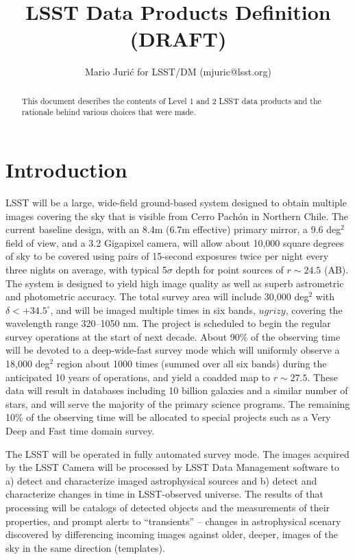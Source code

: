 \documentclass[12pt]{article}
\title{LSST Data Products Definition (DRAFT)}
\author{Mario Juri\'c for LSST/DM (mjuric@lsst.org)}
\newcommand{\B}[1]{{#1}}
\newcommand{\R}[1]{{\color{red}}}
\begin{document}
\maketitle

\begin{abstract}
This document describes the contents of Level 1 and 2 LSST data products and the rationale behind various choices that were made.
\end{abstract}

\tableofcontents

\section{Introduction}

LSST will be a large, wide-field ground-based system
designed to obtain multiple images covering the sky that is visible from Cerro Pach\'{o}n in Northern Chile. The current baseline design, with an 8.4m (6.7m effective) primary mirror, a 9.6 deg$^2$ field of view, and a 3.2 Gigapixel camera, will allow about 10,000 square degrees of sky to be covered using pairs  of 15-second exposures \R{in two photometric bands} \B{twice per night} every three nights on average, with typical 5$\sigma$ depth for point sources of $r\sim24.5$ (AB). The system is designed to yield high image quality as well as superb astrometric  and photometric accuracy. The \B{total} survey area will include 30,000 deg$^2$ with $\delta<+34.5^\circ$, and will be imaged multiple times in six bands, $ugrizy$, covering the wavelength range 320--1050 nm. The project is scheduled to  begin the regular survey operations at the start of next decade. About 90\% of the observing time will be devoted to a deep-wide-fast survey mode which will \B{uniformly} observe a 18,000 deg$^2$ region about 1000 times (summed over all six bands) during the anticipated 10 years of operations, and yield a coadded map to $r\sim27.5$. These data will result in databases including 10 billion galaxies and a similar number of stars, and will serve the majority of the primary science programs. The remaining 10\% of the observing time will be allocated to special projects such as a Very Deep and Fast time domain survey.

The LSST will be operated in fully automated survey mode. The images acquired by the LSST Camera will be processed by LSST Data Management software to a) detect and characterize imaged astrophysical sources and b) detect and characterize changes in time in LSST-observed universe. The results of that processing will be catalogs of detected objects and the measurements of their properties, and prompt alerts to ``transients'' -- changes in astrophysical scenary discovered by differencing incoming images against older, deeper, images of the sky in the same direction (templates).
\end{document}
